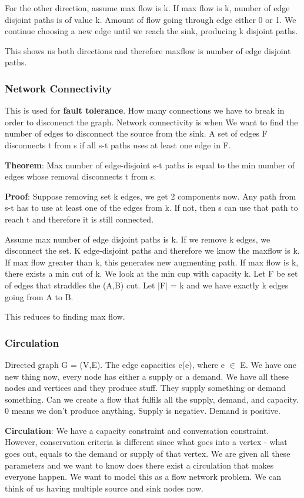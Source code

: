 \documentclass[11pt, oneside]{article}
\theoremstyle{definition}
\begin{document}
For the other direction, assume max flow is k. If max flow is k, number of edge disjoint paths is of value k. Amount of flow going through edge either 0 or 1. We continue choosing a new edge until we reach the sink, producing k disjoint paths.

This shows us both directions and therefore maxflow is number of edge disjoint paths.

\subsubsection{Network Connectivity}

This is used for \textbf{fault tolerance}. How many connections we have to break in order to disconenct the graph. Network connectivity is when We want to find the number of edges to disconnect the source from the sink. A set of edges F disconnects t from s if all s-t paths uses at least one edge in F.

\textbf{Theorem}: Max number of edge-disjoint s-t paths is equal to the min number of edges whose removal disconnects t from s.

\textbf{Proof}: Suppose removing set k edges, we get 2 components now. Any path from s-t has to use at least one of the edges from k. If not, then s can use that path to reach t and therefore it is still connected.

Assume max number of edge disjoint paths is k. If we remove k edges, we disconnect the set. K edge-disjoint paths and therefore we know the maxflow is k. If max flow greater than k, this generates new augmenting path. If max flow is k, there exists a min cut of k. We look at the min cup with capacity k. Let F be set of edges that straddles the (A,B) cut. Let $|$F$|$ = k and we have exactly k edges going from A to B.

This reduces to finding max flow.

\subsubsection{Circulation}
Directed graph G = (V,E). The edge capacities c(e), where e $\in$ E. We have one new thing now, every node has either a supply or a demand. We have all these nodes and vertices and they produce stuff. They supply something or demand something. Can we create a flow that fulfils all the supply, demand, and capacity. 0 means we don't produce anything. Supply is negatiev. Demand is positive.

\textbf{Circulation}: We have a capacity constraint and conversation constraint. However, conservation criteria is different since what goes into a vertex - what goes out, equals to the demand or supply of that vertex. We are given all these parameters and we want to know does there exist a circulation that makes everyone happen. We want to model this as a flow network problem. We can think of us having multiple source and sink nodes now.
\end{document}
